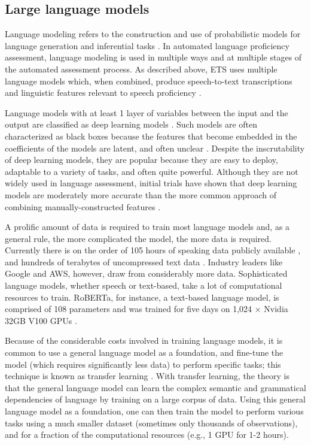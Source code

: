 \documentclass [PhD] {uclathes}
\begin{document}
\subsection{Large language models}

Language modeling refers to the construction and use of probabilistic models for language generation and inferential tasks \citep{jurafskyspeech}. In automated language proficiency assessment, language modeling is used in multiple ways and at multiple stages of the automated assessment process. As described above, ETS uses multiple language models which, when combined, produce speech-to-text transcriptions and linguistic features relevant to speech proficiency \citep{qian2019automatic}.

Language models with at least 1 layer of variables between the input and the output are classified as deep learning models \citep{goodfellow2016deep}. Such models are often characterized as black boxes because the features that become embedded in the coefficients of the models are latent, and often unclear \citep[e.g.][]{gretter2019automatic}. Despite the inscrutability of deep learning models, they are popular because they are easy to deploy, adaptable to a variety of tasks, and often quite powerful. Although they are not widely used in language assessment, initial trials have shown that deep learning models are moderately more accurate than the more common approach of combining manually-constructed features \citep{chen2018end}.

A prolific amount of data is required to train most language models and, as a general rule, the more complicated the model, the more data is required. Currently there is on the order of 105 hours of speaking data publicly available \citep{galvez2021people}, and hundreds of terabytes of uncompressed text data \citep{iderhoff2023}. Industry leaders like Google and AWS, however, draw from considerably more data. Sophisticated language models, whether speech or text-based, take a lot of computational resources to train. RoBERTa, for instance, a text-based language model, is comprised of 108 parameters and was trained for five days on 1,024 × Nvidia 32GB V100 GPUs \citep{liu2019roberta}.

Because of the considerable costs involved in training language models, it is common to use a general language model as a foundation, and fine-tune the model (which requires significantly less data) to perform specific tasks; this technique is known as transfer learning \citep{jurafskyspeech}. With transfer learning, the theory is that the general language model can learn the complex semantic and grammatical dependencies of language by training on a large corpus of data. Using this general language model as a foundation, one can then train the model to perform various tasks using a much smaller dataset (sometimes only thousands of observations), and for a fraction of the computational resources (e.g., 1 GPU for 1-2 hours).
\end{document}
